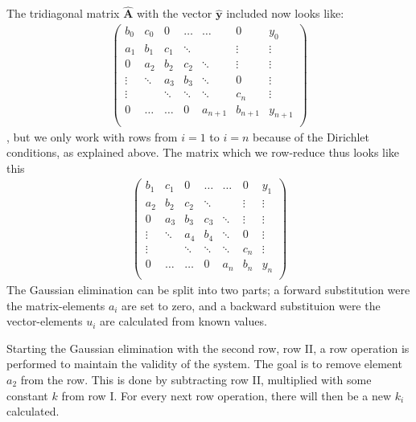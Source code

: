 \documentclass[11pt,a4paper,notitlepage]{article}
\begin{document}
The tridiagonal matrix $\mathbf{\hat{A}}$ with the vector $\mathbf{\hat{y}}$ included now looks like: 
\begin{align*}
\left(\begin{matrix}
  b_0   & c_0    & 0      & \dots   & \dots  & 0       & y_0     \\
  a_1   & b_1    & c_1    & \ddots  &        & \vdots  & \vdots  \\
  0     & a_2    & b_2    & c_2     & \ddots & \vdots  & \vdots  \\
 \vdots & \ddots & a_3    & b_3     & \ddots & 0       & \vdots  \\
 \vdots &        & \ddots & \ddots  & \ddots & c_{n}   & \vdots  \\
  0     & \dots  & \dots  & 0       & a_{n+1}& b_{n+1} & y_{n+1} \\
\end{matrix}\right)
\end{align*} ,
but we only work with rows from $i = 1$ to $i = n$ because of the Dirichlet conditions, as explained above. The matrix which we row-reduce thus looks like this
\begin{align*}
\left(\begin{matrix}
  b_1   & c_1    & 0      & \dots   & \dots  & 0       & y_1     \\
  a_2   & b_2    & c_2    & \ddots  &        & \vdots  & \vdots  \\
  0     & a_3    & b_3    & c_3     & \ddots & \vdots  & \vdots  \\
 \vdots & \ddots & a_4    & b_4     & \ddots & 0       & \vdots  \\
 \vdots &        & \ddots & \ddots  & \ddots & c_n     & \vdots  \\
  0     & \dots  & \dots  & 0       & a_{n}  & b_n     & y_{n}   \\
\end{matrix}\right)
\end{align*}
The Gaussian elimination can be split into two parts; a forward substitution were the matrix-elements $a_i$ are set to zero, and a backward substituion were the vector-elements $u_i$ are calculated from known values.

Starting the Gaussian elimination with the second row, row II, a row operation is performed to maintain the validity of the system. The goal is to remove element $a_2$ from the row. This is done by subtracting row II, multiplied with some constant $k$ from row I. For every next row operation, there will then be a new $k_i$ calculated.
\end{document}
